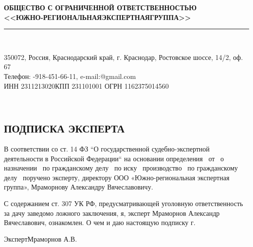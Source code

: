 \setcounter{page}{1}
\pagestyle{empty} %

%
%
\begin{center}
	\normalsize\textbf{ОБЩЕСТВО С ОГРАНИЧЕННОЙ ОТВЕТСТВЕННОСТЬЮ \\[-1.5mm]<<ЮЖНО-РЕГИОНАЛЬНАЯ\quad ЭКСПЕРТНАЯ\quad ГРУППА>> \\[-5mm]}
	\noindent\rule{\textwidth}{1pt}\\[-6mm]  %
\end{center}

\begin{center}
	\begin{footnotesize}
		\vspace{-3.5mm}350072, Россия, Краснодарский край, г. Краснодар, Ростовское шоссе, 14/2, оф. 67\\[0mm]
		Телефон: -918-451-66-11, e-mail:@gmail.com\\ [-2mm]{ИНН 2311213020\quad КПП 231101001 ОГРН 1162375014560}
	\end{footnotesize}	\\[10mm]
\end{center}




\begin{center}
	\section{{\Large \textbf{ПОДПИСКА      ЭКСПЕРТА}}}
\end{center}




В соответствии со ст. 14  ФЗ “О государственной судебно-экспертной деятельности в Российской Федерации“ на основании определения \sud \,  от \dataopr  \, о назначении \opr \, по гражданскому делу \delonum \, по иску \isk \,  производство \opr \, по гражданскому делу \delonum \, поручено эксперту,  директору ООО «Южно-региональная экспертная группа»,   Мраморнову Александру Вячеславовичу. 

\vspace{5mm}

С содержанием ст. 307 УК РФ, предусматривающей уголовную ответственность за дачу заведомо ложного заключения, я, эксперт Мраморнов Александр Вячеславович, ознакомлен.  О  чем и даю настоящую подписку \datastart г.





\vspace{30mm}

{Эксперт}\hfill           {Мраморнов А.В.}